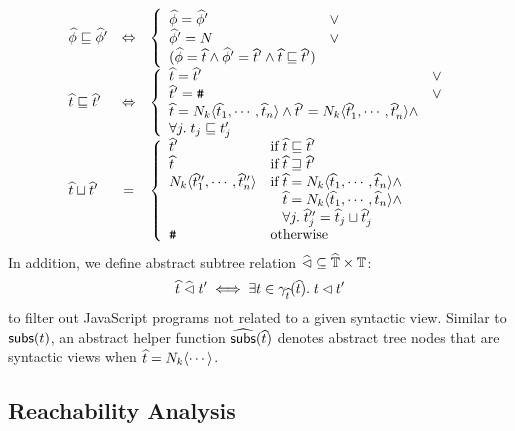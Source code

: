 \[
  \begin{array}{lcl}
    \anode \order \anode' &\Leftrightarrow& \left\{
      \begin{array}{ll}
        \anode = \anode' &\vee\\

        \anode' = \nt &\vee\\

        (\anode = \atree \wedge \anode' = \atree' \wedge \atree \order
        \atree')\\
      \end{array}
    \right.\\

    \atree \order \atree' &\Leftrightarrow& \left\{
      \begin{array}{ll}
        \atree = \atree' &\vee\\

        \atree' = \treetop &\vee\\

        \begin{array}{@{}l@{}}
          \atree = \nt_k \langle \atree_1, \cdots, \atree_n \rangle \wedge
          \atree' = \nt_k \langle \atree'_1, \cdots, \atree'_n \rangle \wedge\\
          \forall j. \; \tree_j \order \tree'_j\\
        \end{array}\\
      \end{array}
    \right.\\

    \atree \join \atree' &=& \left\{
      \begin{array}{ll}
        \atree' & \text{if} \; \atree \order \atree'\\

        \atree & \text{if} \; \atree \revorder \atree'\\

        \nt_k \langle \atree''_1, \cdots, \atree''_n \rangle &
        \text{if} \; \atree = \nt_k \langle \atree_1, \cdots, \atree_n \rangle
        \wedge\\&
        \phantom{\text{if} \;} \atree = \nt_k \langle \atree_1, \cdots, \atree_n
        \rangle \wedge\\&
        \phantom{\text{if} \;} \forall j. \; \atree''_j = \atree_j
        \join \atree'_j\\
        \treetop & \text{otherwise}\\
      \end{array}
    \right.\\
  \end{array}
\]
In addition, we define abstract subtree relation $\widehat{\lhd} \subseteq \widehat{\mathbb{T}}
\times \mathbb{T}$:
\[
  \widehat{t} \; \widehat{\lhd} \; t' \iff \exists t \in \gamma_{\widehat{t}}(\widehat{t}). \;
  t \lhd t'
\]
to filter out JavaScript programs not related to a given syntactic view.
Similar to $\getsubs(\tree)$, an abstract helper function $\agetsubs(\atree)$
denotes abstract tree nodes that are syntactic views when $\widehat{t} = N_k
\langle \cdots \rangle$.

\subsection{Reachability Analysis}\label{sec:view}

\todo
